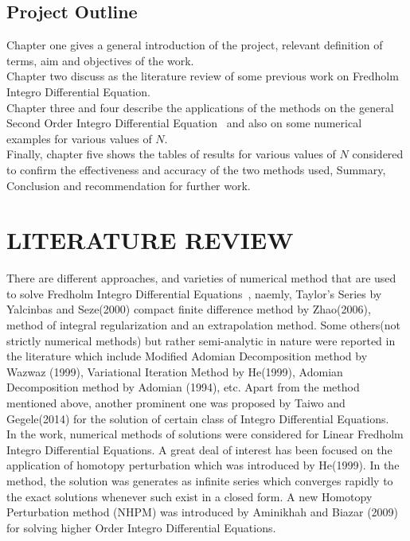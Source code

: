 \documentclass[12pt]{report}
\newcommand{\IDE}{Integro Differential Equation}
\newcommand{\IDEs}{Integro Differential Equations}
\newcommand{\NI}{\noindent}
\begin{document}
	\section{Project Outline}
	Chapter one gives a general introduction of the project, relevant definition of terms, aim and objectives of the work.\\
	
	\NI Chapter two discuss as the literature review of some previous work on Fredholm \IDE.\\
	
	\NI Chapter three and four describe the applications of the methods on the general Second Order \IDE~ and also on some numerical examples for various values of $N$.\\
	
	\NI Finally, chapter five shows the tables of results for various values of $N$ considered to confirm the effectiveness and accuracy of the two methods used, Summary, Conclusion and recommendation for further work.
	
	\newpage
	
	\chapter{LITERATURE REVIEW}
	There are different approaches, and varieties of numerical method that are used to solve Fredholm \IDEs~, naemly, Taylor's Series by Yalcinbas and Seze(2000) compact finite difference method by Zhao(2006), method of integral regularization and an extrapolation method. Some others(not strictly numerical methods) but rather semi-analytic in nature were reported in the literature which include Modified Adomian Decomposition method by Wazwaz (1999), Variational Iteration Method by He(1999), Adomian Decomposition method by Adomian (1994), etc. Apart from the method mentioned above, another prominent one was proposed by Taiwo and Gegele(2014) for the solution of certain class of \IDEs.\\
	
	\NI In the work, numerical methods of solutions were considered for Linear Fredholm \IDEs. A great deal of interest has been focused on the application of homotopy perturbation which was introduced by He(1999). In the method, the solution was generates as infinite series which converges rapidly to the exact solutions whenever such exist in a closed form. A new Homotopy Perturbation method (NHPM) was introduced by Aminikhah and Biazar (2009) for solving higher Order \IDEs.
	
\end{document}
